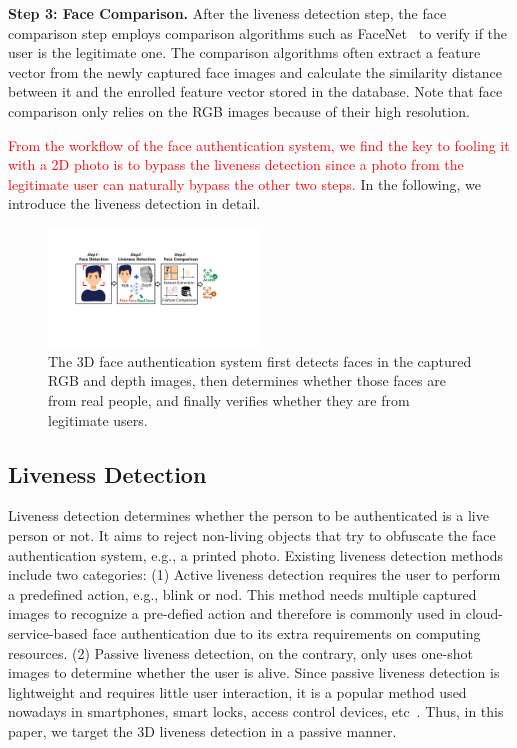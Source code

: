 \textbf{Step 3: Face Comparison.} After the liveness detection step, the face comparison step employs comparison algorithms such as FaceNet~\cite{schroff2015facenet} to verify if the user is the legitimate one. The comparison algorithms often extract a feature vector from the newly captured face images and calculate the similarity distance between it and the enrolled feature vector stored in the database. Note that face comparison only relies on the RGB images because of their high resolution.

\textcolor{red}{From the workflow of the face authentication system, we find the key to fooling it with a 2D photo is to bypass the liveness detection since a photo from the legitimate user can naturally bypass the other two steps.}
In the following, we introduce the liveness detection in detail.

\begin{figure}[pt]
	\centerline{\includegraphics[width = 0.5\textwidth]{figures/face_auth_workflow.pdf}}
	\vspace{-0.15in}
	\caption{The 3D face authentication system first detects faces in the captured RGB and depth images, then determines whether those faces are from real people, and finally verifies whether they are from legitimate users.}
	\label{fas_workflow}
	\vspace{-0.15in}
\end{figure}

\subsection{Liveness Detection}
Liveness detection determines whether the person to be authenticated is a live person or not. 
It aims to reject non-living objects that try to obfuscate the face authentication system, e.g., a printed photo.
Existing liveness detection methods include two categories: 
(1) Active liveness detection requires the user to perform a predefined action, e.g., blink or nod. This method needs multiple captured images to recognize a pre-defied action and therefore is commonly used in cloud-service-based face authentication due to its extra requirements on computing resources. 
(2) Passive liveness detection, on the contrary, only uses one-shot images to determine whether the user is alive. 
Since passive liveness detection is lightweight and requires little user interaction, it is a popular method used nowadays in smartphones, smart locks, access control devices, etc~\cite{chakraborty2014overview}. Thus, in this paper, we target the 3D liveness detection in a passive manner. 

